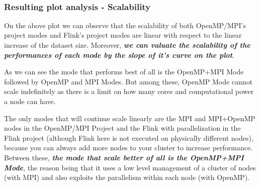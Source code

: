 \documentclass[11pt]{article}
\begin{document}
    \begin{center}
    \end{center}
    { \hspace*{\fill} \\}
    
    \hypertarget{resulting-plot-analysis---scalability}{%
\subsubsection{Resulting plot analysis -
Scalability}\label{resulting-plot-analysis---scalability}}

On the above plot we can observe that the scalability of both
OpenMP/MPI's project modes and Flink's project modes are linear with
respect to the linear increase of the dataset size. Moreover,
\textbf{\emph{we can valuate the scalability of the performances of each
mode by the slope of it's curve on the plot}}.

As we can see the mode that performs best of all is the OpenMP+MPI Mode
followed by OpenMP and MPI Modes. But among these, OpenMP Mode cannot
scale indefinitely as there is a limit on how many cores and
computational power a node can have.

The only modes that will continue scale linearly are the MPI and
MPI+OpenMP nodes in the OpenMP/MPI Project and the Flink with
parallelization in the Flink project (although Flink here is not
executed on physically different nodes), because you can always add more
nodes to your cluster to increase performance. Between these,
\textbf{\emph{the mode that scale better of all is the OpenMP+MPI
Mode}}, the reason being that it uses a low level management of a
cluster of nodes (with MPI) and also exploits the parallelism within
each node (with OpenMP).


    
    
    
    
\end{document}
